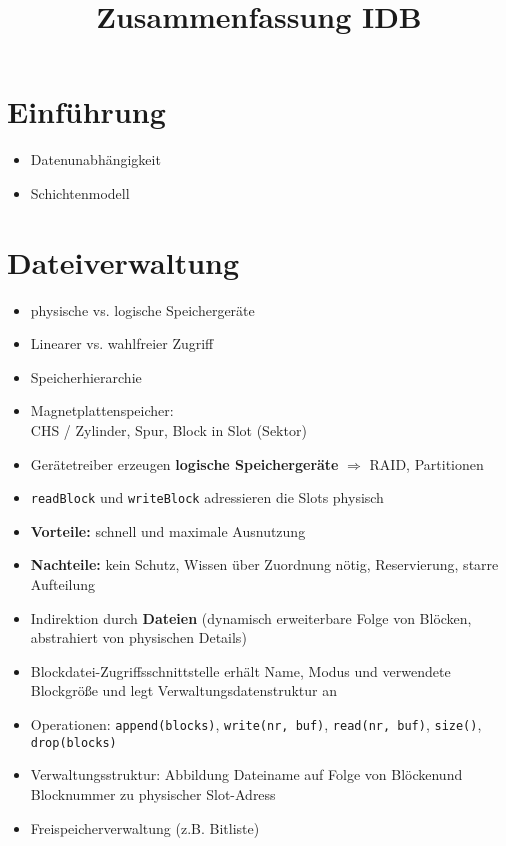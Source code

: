 \documentclass[11pt, paper=a4, twocolumn]{scrartcl}
\title{\vspace{-1.25cm}Zusammenfassung IDB\vspace{-0.25cm}}
\date{\vspace{-5ex}}
\begin{document}
	\maketitle


	\section{Einführung}
		\begin{itemize}
			\item Datenunabhängigkeit
			\item Schichtenmodell
		\end{itemize}

	\section{Dateiverwaltung}
		\begin{itemize}
			\item physische vs. logische Speichergeräte
			\item Linearer vs. wahlfreier Zugriff
			\item Speicherhierarchie
			\item Magnetplattenspeicher: \\
				CHS / Zylinder, Spur, Block in Slot (Sektor)
			\item Gerätetreiber erzeugen \textbf{logische Speichergeräte}
				$\Rightarrow$ RAID, Partitionen
			\item \texttt{readBlock} und \texttt{writeBlock} adressieren die 
				Slots physisch
			\item \textbf{Vorteile:} schnell und maximale Ausnutzung 
			\item \textbf{Nachteile:} kein Schutz, Wissen über Zuordnung nötig, 
				Reservierung, starre Aufteilung
			\item Indirektion durch \textbf{Dateien} (dynamisch erweiterbare Folge von 
				Blöcken, abstrahiert von physischen Details)
			\item Blockdatei-Zugriffsschnittstelle erhält Name, Modus und 
				verwendete Blockgröße und legt Verwaltungsdatenstruktur an
			\item Operationen: \texttt{append(blocks)}, 
				\texttt{write(nr, buf)}, \texttt{read(nr, buf)}, 
				\texttt{size()}, \texttt{drop(blocks)}
			\item Verwaltungsstruktur: Abbildung Dateiname auf Folge von 
				Blöckenund Blocknummer zu physischer Slot-Adress
			\item Freispeicherverwaltung (z.B. Bitliste)
		\end{itemize}
\end{document}
